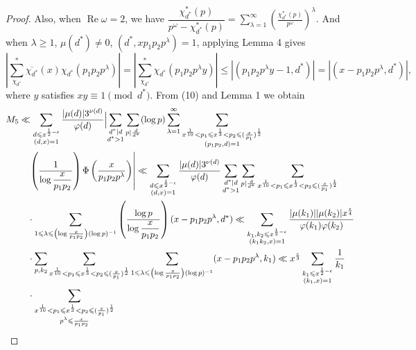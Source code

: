 \begin{proof}
Also, when $\operatorname{Re}\omega=2$, we have $\dfrac{\chi_{d^*}^*(p)}{p^\omega-\chi_{d^*}^*(p)}=\displaystyle\sum_{\lambda=1}^{\infty}\left(\frac{\chi_{d^*}^*(p)}{p^\omega}\right)^\lambda$. And when $\lambda\geqslant1$, $\mu(d^*)\neq0$, $(d^*,xp_1p_2p^\lambda)=1$, applying Lemma 4 gives
\begin{equation}\label{eq:chen10en}
\left|\sum_{\chi_{d^*}}^{*}\overline{\chi_{d^*}}(x)\chi_{d^*}(p_1p_2p^\lambda)\right|
=\left|\sum_{\chi_{d^*}}^{*}\chi_{d^*}(p_1p_2p^\lambda y)\right|
\leqslant|(p_1p_2p^\lambda y-1,d^*)|=|(x-p_1p_2p^\lambda,d^*)|,
\end{equation}
where $y$ satisfies $xy\equiv1\pmod{d^*}$. From (10) and Lemma 1 we obtain
\begin{align*}
M_5&\ll\sum_{\substack{d\leqslant x^{\frac12-\epsilon}\\(d,x)=1}}\frac{|\mu(d)|3^{\nu(d)}}{\varphi(d)}
\Bigl|\sum_{\substack{d^*\mid d\\d^*>1}}\sum_{p\mid\frac{d}{d^*}}(\log p)\sum_{\lambda=1}^{\infty}
\sum_{\substack{x^{\frac1{10}}<p_1\leqslant x^{\frac13}<p_2\leqslant(\frac{x}{p_1})^{\frac12}\\(p_1p_2,d)=1}}\Bigr.\\
&\quad\left.\left(\frac1{\log\dfrac{x}{p_1p_2}}\right)\Phi\left(\frac{x}{p_1p_2p^\lambda}\right)\right|
\ll\sum_{\substack{d\leqslant x^{\frac12-\epsilon}\\(d,x)=1}}\frac{|\mu(d)|3^{\nu(d)}}{\varphi(d)}
\sum_{\substack{d^*\mid d\\d^*>1}}\sum_{p\mid\frac{d}{d^*}}\sum_{\substack{x^{\frac1{10}}<p_1\leqslant x^{\frac13}<p_2\leqslant(\frac{x}{p_1})^{\frac12}}}\\
&\quad\cdot\sum_{1\leqslant\lambda\leqslant\left(\log\frac{x}{p_1p_2}\right)(\log p)^{-1}}
\left(\frac{\log p}{\log\dfrac{x}{p_1p_2}}\right)(x-p_1p_2p^\lambda,d^*)
\ll\sum_{\substack{k_1,k_2\leqslant x^{\frac12-\epsilon}\\(k_1k_2,x)=1}}\frac{|\mu(k_1)||\mu(k_2)|x^{\frac{\epsilon}{4}}}{\varphi(k_1)\varphi(k_2)}\\
&\quad\cdot\sum_{p,k_2}\sum_{\substack{x^{\frac1{10}}<p_1\leqslant x^{\frac13}<p_2\leqslant(\frac{x}{p_1})^{\frac12}}}
\sum_{1\leqslant\lambda\leqslant\left(\log\frac{x}{p_1p_2}\right)(\log p)^{-1}}(x-p_1p_2p^\lambda,k_1)
\ll x^{\frac{\epsilon}{3}}\sum_{\substack{k_1\leqslant x^{\frac12-\epsilon}\\(k_1,x)=1}}\frac1{k_1}\\
&\quad\cdot\sum_{\substack{x^{\frac1{10}}<p_1\leqslant x^{\frac13}<p_2\leqslant(\frac{x}{p_1})^{\frac12}\\p^\lambda\leqslant\frac{x}{p_1p_2}}}

\end{align*}
\end{proof}
